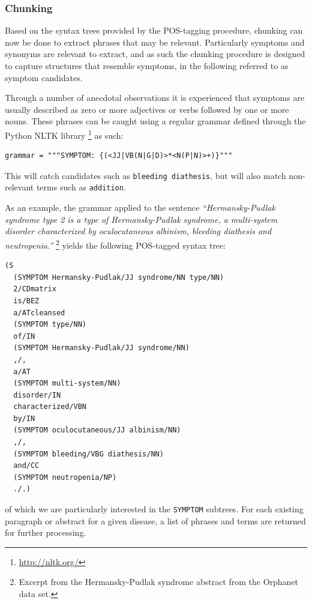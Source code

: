\documentclass[10pt,letterpaper,final]{article}
\begin{document}
\subsubsection{Chunking}
Based on the syntax trees provided by the POS-tagging procedure,
chunking can now be done to extract phrases that may be relevant.
Particularly symptoms and synonyms are relevant to extract, and as such
the chunking procedure is designed to capture structures that resemble
symptoms, in the following referred to as symptom candidates.

Through a number of anecdotal observations it is experienced that
symptoms are usually described as zero or more adjectives or verbs
followed by one or more nouns. These phrases can be caught using a
regular grammar defined through the Python NLTK library
\footnote{\url{http://nltk.org/}} as such:
\begin{lstlisting}
grammar = """SYMPTOM: {(<JJ|VB(N|G|D)>*<N(P|N)>+)}"""
\end{lstlisting}
This will catch candidates such as \texttt{bleeding diathesis}, but will
also match non-relevant terms such as \texttt{addition}.

As an example, the grammar applied to the sentence
\textit{``Hermansky-Pudlak syndrome type 2 is a type of Hermansky-Pudlak
syndrome, a multi-system disorder characterized by oculocutaneous
albinism, bleeding diathesis and neutropenia.''} \footnote{Excerpt from
the Hermansky-Pudlak syndrome abstract from the Orphanet data set.}
yields the following POS-tagged syntax tree:
\begin{lstlisting}
(S
  (SYMPTOM Hermansky-Pudlak/JJ syndrome/NN type/NN)
  2/CDmatrix
  is/BEZ
  a/ATcleansed 
  (SYMPTOM type/NN)
  of/IN
  (SYMPTOM Hermansky-Pudlak/JJ syndrome/NN)
  ,/,
  a/AT
  (SYMPTOM multi-system/NN)
  disorder/IN
  characterized/VBN
  by/IN
  (SYMPTOM oculocutaneous/JJ albinism/NN)
  ,/,
  (SYMPTOM bleeding/VBG diathesis/NN)
  and/CC
  (SYMPTOM neutropenia/NP)
  ./.)
\end{lstlisting}
of which we are particularly interested in the \texttt{SYMPTOM}
subtrees. For each existing paragraph or abstract for a given disease, a
list of phrases and terms are returned for further processing.
\end{document}
